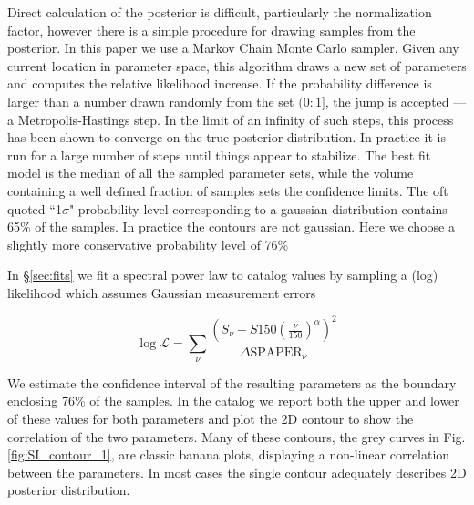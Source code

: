 \documentclass[preprint]{aastex}
\newcommand{\logL}{\log\mathcal{L}}
\begin{document}
Direct calculation of the posterior is difficult, particularly the normalization factor, however there is a simple procedure for drawing samples from the posterior. In this paper we use a Markov Chain Monte Carlo sampler. Given any current location in parameter space, this algorithm draws a new set of parameters and computes the relative likelihood increase. If the probability difference is larger than a number drawn randomly from the set $(0:1]$, the jump is accepted ---a Metropolis-Hastings step. In the limit of an infinity of such steps, this process has been shown to converge on the true posterior distribution.  In practice it is run for a large number of steps until things appear to stabilize. The best fit model is the median of all the sampled parameter sets, while the volume containing a well defined fraction of samples sets the confidence limits.  The oft quoted ``1$\sigma$" probability level corresponding to a gaussian distribution contains 65\% of the samples. In practice the contours are not gaussian. Here we choose a slightly more conservative probability level of 76\% 

In \S \ref{sec:fits} we fit a spectral power law to catalog values by sampling a (log) likelihood which assumes Gaussian measurement errors

\[
\logL = \sum_\nu{\frac{\left(S_\nu - S150\left(\frac{\nu}{150}\right)^\alpha\right)^2}{\Delta \textrm{SPAPER}_\nu}} \label{eq:catlogL}
\]

We estimate the confidence interval of the resulting parameters as the boundary enclosing 76\% of the samples. In the catalog we report both the upper and lower of these values for both parameters and plot the 2D contour to show the correlation of the two parameters. Many of these contours, the grey curves in Fig. \ref{fig:SI_contour_1}, are classic banana plots, displaying a non-linear correlation between the parameters.    In most cases the single contour adequately describes 2D posterior distribution.
\end{document}
